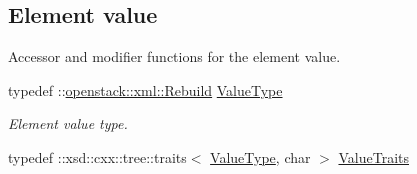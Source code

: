 \subsection*{Element value}
\label{_amgrp2ee2eae1a8c390ea033f241c027da8d6}
Accessor and modifier functions for the element value. \begin{DoxyCompactItemize}
\item 
\hypertarget{classopenstack_1_1xml_1_1Rebuild___a779e5d9c5b05dfebf316ceb05011d0d5}{
typedef ::\hyperlink{classopenstack_1_1xml_1_1Rebuild}{openstack::xml::Rebuild} \hyperlink{classopenstack_1_1xml_1_1Rebuild___a779e5d9c5b05dfebf316ceb05011d0d5}{ValueType}}
\label{classopenstack_1_1xml_1_1Rebuild___a779e5d9c5b05dfebf316ceb05011d0d5}

\begin{DoxyCompactList}\small\item\em Element value type. \item\end{DoxyCompactList}\item 
\hypertarget{classopenstack_1_1xml_1_1Rebuild___acd928ef45a9e2c6934d9a64e2276af6f}{
typedef ::xsd::cxx::tree::traits$<$ \hyperlink{classopenstack_1_1xml_1_1Rebuild}{ValueType}, char $>$ \hyperlink{classopenstack_1_1xml_1_1Rebuild___acd928ef45a9e2c6934d9a64e2276af6f}{ValueTraits}}
\label{classopenstack_1_1xml_1_1Rebuild___acd928ef45a9e2c6934d9a64e2276af6f}


\end{DoxyCompactItemize}
